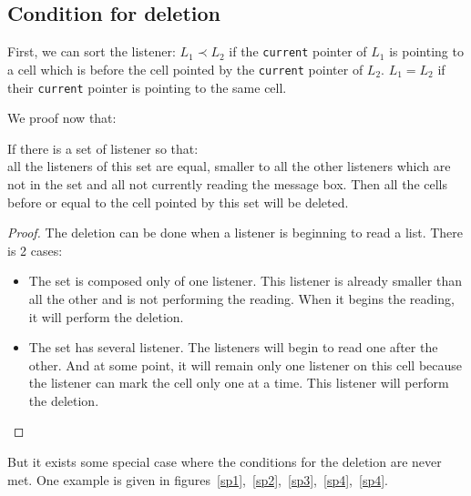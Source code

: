 \subsection{Condition for deletion}
\label{deletion_not_always_possible}

First, we can sort the listener: $L_1 \prec L_2$ if the \verb|current| pointer of $L_1$
is pointing to a cell which is before the cell pointed by the \verb|current|
pointer of $L_2$. $L_1 = L_2$ if their \verb|current| pointer is pointing to the same cell.

We proof now that:
\begin{myproperty}
If there is a set of listener so that:\\
all the listeners of this set are equal, smaller to all the other listeners which are not in the set
and all not currently reading the message box.
Then all the cells before or equal to the cell pointed by this set will be deleted.
\end{myproperty}
\begin{proof}

The deletion can be done when a listener is beginning to read a list.
There is 2 cases:
\begin{itemize}
    \item The set is composed only of one listener. This listener is already smaller 
    than all the other and is not performing the reading.
    When it begins the reading, it will perform the deletion.

    \item The set has several listener.
    The listeners will begin to read one after the other. And at some point,
    it will remain only one listener on this cell because the listener can
    mark the cell only one at a time. This listener will perform the deletion.
\end{itemize}
\end{proof}

But it exists some special case where the conditions for the deletion are never met.
One example is given in figures~\ref{sp1},~\ref{sp2},~\ref{sp3},~\ref{sp4},~\ref{sp4}.


